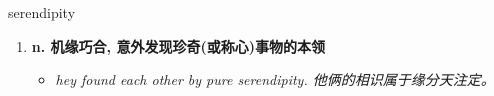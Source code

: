 
\begin{frame}
{\huge serendipity}
\begin{center}
\begin{enumerate}\Large
  \item \textbf{n. 机缘巧合, 意外发现珍奇(或称心)事物的本领}
  \begin{itemize}
    \item \em{\Large{hey found each other by pure serendipity. 他俩的相识属于缘分天注定。}}
  \end{itemize}
\end{enumerate}
\end{center}
\end{frame}
